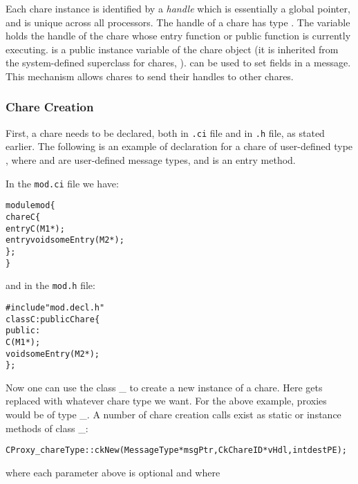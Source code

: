 Each chare instance is identified by a {\em handle} 
which is essentially a global pointer, and is unique across all
processors.  The handle of a chare has type .  The
variable  holds the handle of the
chare whose entry function or public function is currently executing.
 is a public instance variable of the chare object
(it is inherited from the system-defined superclass for chares, ).
 can be used to set fields in a message. This  
mechanism allows chares to send their handles to other chares.

\subsubsection{Chare Creation}
\label{chare creation}

First, a chare needs to be declared, both in \texttt{.ci} file and
in \texttt{.h} file, as stated earlier. The following is an example of
declaration for a chare of user-defined type , where 
and  are user-defined message types, and 
is an entry method.

In the \texttt{mod.ci} file we have:

\begin{alltt}
module mod \{
  chare C \{
    entry C(M1 *);
    entry void someEntry(M2 *);
  \};
\}
\end{alltt}

and in the \texttt{mod.h} file:

\begin{alltt}
#include "mod.decl.h"
class C : public Chare \{
  public:
    C(M1 *);
    void someEntry(M2 *);
\};
\end{alltt}

Now one can use the class \_ to create a new instance
of a chare.  Here  gets replaced with whatever
chare type we want.  For the above example, proxies would be of
type \_. A number of chare creation calls exist
as static or instance methods of class \_:

\begin{alltt}
   CProxy_chareType::ckNew(MessageType *msgPtr, CkChareID *vHdl, int destPE);
\end{alltt}

where each parameter above is optional and where

